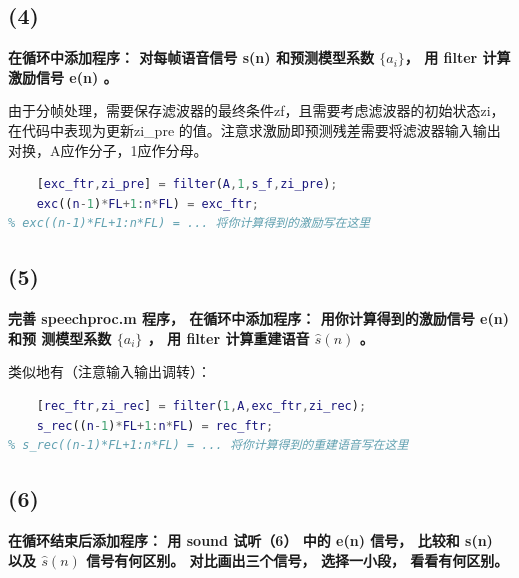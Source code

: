\documentclass[10pt]{article}
\begin{document}
\subsection*{(4)}
\textbf{\color{gray}在循环中添加程序： 对每帧语音信号 s(n) 和预测模型系数 $\{a_i\} $， 用 filter 计算
激励信号 e(n) 。}

由于分帧处理，需要保存滤波器的最终条件zf，且需要考虑滤波器的初始状态zi，在代码中表现为更新zi\_pre
的值。注意求激励即预测残差需要将滤波器输入输出对换，A应作分子，1应作分母。
\begin{lstlisting}[language=matlab]
% (4) 在此位置写程序，用filter函数s_f计算激励，注意保持滤波器状态
    [exc_ftr,zi_pre] = filter(A,1,s_f,zi_pre);
    exc((n-1)*FL+1:n*FL) = exc_ftr;
% exc((n-1)*FL+1:n*FL) = ... 将你计算得到的激励写在这里
\end{lstlisting}
\subsection*{(5)}
\textbf{\color{gray}完善 speechproc.m 程序， 在循环中添加程序： 用你计算得到的激励信号 e(n) 和预
测模型系数 $\{a_i\} $ ， 用 filter 计算重建语音 $\hat{s}(n)$ 。}

类似地有（注意输入输出调转）：
\begin{lstlisting}[language=matlab]
% (5) 在此位置写程序，用filter函数和exc重建语音，注意保持滤波器状态
    [rec_ftr,zi_rec] = filter(1,A,exc_ftr,zi_rec);
    s_rec((n-1)*FL+1:n*FL) = rec_ftr;
% s_rec((n-1)*FL+1:n*FL) = ... 将你计算得到的重建语音写在这里
\end{lstlisting}

\subsection*{(6)}
\textbf{\color{gray}在循环结束后添加程序： 用 sound 试听（6） 中的 e(n) 信号， 比较和 s(n) 以及 $\hat{s}(n)$
信号有何区别。 对比画出三个信号， 选择一小段， 看看有何区别。}
\end{document}

